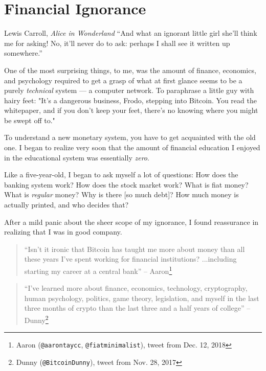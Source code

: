 \chapter{Financial Ignorance}
\label{les:8}

\begin{chapquote}{Lewis Carroll, \textit{Alice in Wonderland}}
``And what an ignorant little girl she'll think me for asking! No, it'll never
do to ask: perhaps I shall see it written up somewhere.''
\end{chapquote}

One of the most surprising things, to me, was the amount of finance,
economics, and psychology required to get a grasp of what at first
glance seems to be a purely \textit{technical} system --- a computer network.
To paraphrase a little guy with hairy feet: "It's a dangerous business,
Frodo, stepping into Bitcoin. You read the whitepaper, and if you don't
keep your feet, there's no knowing where you might be swept off to."

To understand a new monetary system, you have to get acquainted with the
old one. I began to realize very soon that the amount of financial
education I enjoyed in the educational system was essentially \textit{zero}.

Like a five-year-old, I began to ask myself a lot of questions: How does
the banking system work? How does the stock market work? What is fiat
money? What is \textit{regular} money? Why is there [so much debt]? How much
money is actually printed, and who decides that?

After a mild panic about the sheer scope of my ignorance, I found
reassurance in realizing that I was in good company.

\begin{quotation}
``Isn't it ironic that Bitcoin has taught me more about money than all these
years I've spent working for financial institutions? ...including starting my
career at a central bank''
\flushright -- Aaron\footnote{Aaron (\texttt{@aarontaycc}, \texttt{@fiatminimalist}), tweet from Dec.
12, 2018\cite{aarontaycc-tweet}}
\end{quotation}

\begin{quotation}
``I've learned more about finance, economics, technology, cryptography, human
psychology, politics, game theory, legislation, and myself in the last three
months of crypto than the last three and a half years of college''
\flushright -- Dunny\footnote{Dunny (\texttt{@BitcoinDunny}), tweet from Nov. 28,
2017\cite{bitcoindunny-tweet}}
\end{quotation}

